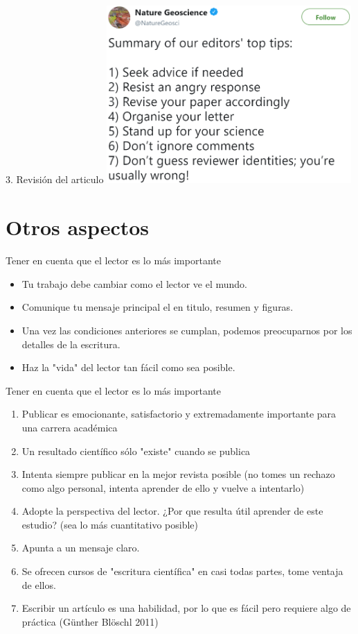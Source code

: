 \documentclass[
10pt,
aspectratio=169,
]{beamer}
\begin{document}
\begin{frame}{3. Revisi\'on del articulo}
\centering
\includegraphics[width=0.7\textwidth]{fi4.png}
\end{frame}

\section{Otros aspectos}
\begin{frame}{Tener en cuenta que el lector es lo m\'as importante}
\begin{itemize}
\item Tu trabajo debe cambiar como el lector ve el mundo.
\item Comunique tu mensaje principal el en \alert{titulo},   \alert{resumen} y \alert{figuras}.
\item Una vez las condiciones anteriores se cumplan, podemos preocuparnos por los detalles de la escritura.
\item Haz la "vida" del lector tan fácil como sea posible.
\end{itemize}
\end{frame}

\begin{frame}{Tener en cuenta que el lector es lo m\'as importante}
\begin{enumerate}
\item Publicar es emocionante, satisfactorio y extremadamente importante para una carrera académica
\item Un resultado científico sólo "existe" cuando se publica
\item Intenta siempre publicar en la mejor revista posible (no tomes un rechazo como algo personal, intenta aprender de ello y vuelve a intentarlo)
\item Adopte la perspectiva del lector. ¿Por que resulta útil aprender de este estudio? (sea lo más cuantitativo posible)
\item Apunta a un mensaje claro.
\item Se ofrecen cursos de "escritura científica" en casi todas partes, tome ventaja de ellos.
\item Escribir un artículo es una habilidad, por lo que es fácil pero requiere algo de práctica (Günther Blöschl 2011)
\end{enumerate}
\end{frame}
\end{document}

